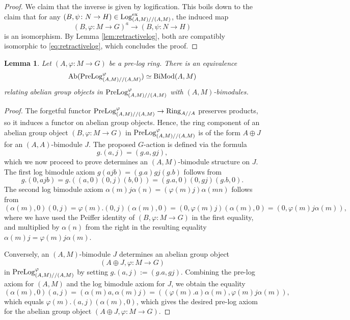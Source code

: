 \documentclass[a4paper,10pt%
]{amsart}
\numberwithin{equation}{section}
\newtheorem{lemma}[subsection]{Lemma}
\theoremstyle{definition}
\renewcommand{\:}{\colon}
\begin{document}
\begin{proof} We claim that the inverse is given by logification. This boils down to the claim that for any $(B, \psi \colon N \to H) \in {\rm Log}^{\rm ex}_{(A, M) // (A, M)}$, the induced map \[(B, \varphi \colon M \to G)^a \to (B, \psi \colon N \to H)\] is an isomorphism. By Lemma \ref{lem:retractivelog}, both are compatibly isomorphic to \eqref{eq:retractivelog}, which concludes the proof. 
\end{proof}

\begin{lemma}\label{lem:abphi} Let $(A, \varphi \colon M \to G)$ be a pre-log ring. There is an equivalence \[{\rm Ab}({\rm PreLog}^\varphi_{(A, M) // (A, M)}) \simeq {\rm BiMod}{(A, M)}\] relating abelian group objects in ${\rm PreLog}^\varphi_{(A, M) // (A, M)}$ with $(A, M)$-bimodules. 
\end{lemma}

\begin{proof} The forgetful functor ${\rm PreLog}_{(A, M)//(A, M)}^\varphi \to {\rm Ring}_{A//A}$ preserves products, so it induces a functor on abelian group objects. Hence, the ring component of an abelian group object $(B, \varphi \colon M \to G)$ in ${\rm PreLog}_{(A, M)//(A, M)}^\varphi$ is of the form $A \oplus J$ for an $(A, A)$-bimodule $J$. The proposed $G$-action is defined via the formula \[g.(a, j) = (g.a, gj),\] which we now proceed to prove determines an $(A, M)$-bimodule structure on $J$. The first log bimodule axiom $g(ajb) = (g.a)gj(g.b)$ follows from \[g.(0, ajb) = g.((a, 0)(0, j)(b, 0)) = (g.a, 0)(0, gj)(g.b, 0).\] The second log bimodule axiom $\alpha(m)j\alpha(n) = (\varphi(m)j)\alpha(mn)$ follows from \[(\alpha(m), 0)(0, j) = \varphi(m).(0, j)(\alpha(m), 0) = (0, \varphi(m)j)(\alpha(m), 0) = (0, \varphi(m)j\alpha(m)),\] where we have used the Peiffer identity of $(B, \varphi \colon M \to G)$ in the first equality, and multiplied by $\alpha(n)$ from the right in the resulting equality $\alpha(m)j = \varphi(m)j\alpha(m)$.  

Conversely, an $(A, M)$-bimodule $J$ determines an abelian group object \begin{equation}\label{eq:abgrpob}(A \oplus J, \varphi \colon M \to G)\end{equation} in ${\rm PreLog}^{\varphi}_{(A, M) // (A, M)}$ by setting $g.(a, j) := (g.a, gj)$. Combining the pre-log axiom for $(A, M)$ and the log bimodule axiom for $J$, we obtain the equality \[(\alpha(m), 0)(a, j) = (\alpha(m)a, \alpha(m)j) = ((\varphi(m).a)\alpha(m), \varphi(m)j\alpha(m)),\] which equals $\varphi(m).(a, j)(\alpha(m), 0)$, which gives the desired pre-log axiom for the abelian group object $(A \oplus J, \varphi \colon M \to G)$. 
\end{proof}
\end{document}
